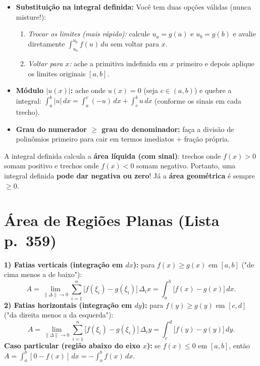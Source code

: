 \documentclass[10pt,a4paper]{article}
\begin{document}
\begin{dica}
    \begin{itemize}
        \item \textbf{Substituição na integral definida:} Você tem duas opções válidas (nunca misture!):
              \begin{enumerate}
                  \item \emph{Trocar os limites (mais rápido):} calcule $u_a = g(a)$ e $u_b = g(b)$ e avalie diretamente $\int_{u_a}^{u_b} f(u)\,du$ sem voltar para $x$.
                  \item \emph{Voltar para $x$:} ache a primitiva indefinida em $x$ primeiro e depois aplique os limites originais $[a,b]$.
              \end{enumerate}
        \item \textbf{Módulo $|u(x)|$:} ache onde $u(x) = 0$ (seja $c \in (a,b)$) e quebre a integral: $\int_{a}^{b} |u|\,dx = \int_{a}^{c} (-u)\,dx + \int_{c}^{b} u\,dx$ (conforme os sinais em cada trecho).
        \item \textbf{Grau do numerador $\ge$ grau do denominador:} faça a divisão de polinômios primeiro para cair em termos imediatos + fração própria.
    \end{itemize}
\end{dica}

\begin{cuidado}
    A integral definida calcula a \textbf{área líquida (com sinal)}: trechos onde $f(x) > 0$ somam positivo e trechos onde $f(x) < 0$ somam negativo. Portanto, uma integral definida \textbf{pode dar negativa ou zero}! Já a \textbf{área geométrica} é sempre $\ge 0$.
\end{cuidado}

\section{Área de Regiões Planas (Lista p.\ 359)}

\begin{teo}
    \textbf{1) Fatias verticais (integração em $dx$):} para $f(x) \ge g(x)$ em $[a,b]$ ("de cima menos a de baixo"):
    \[
        A = \lim_{\|\Delta\| \to 0} \sum_{i=1}^{n} \big[f(\xi_i) - g(\xi_i)\big]\,\Delta_i x = \int_{a}^{b} \big[f(x) - g(x)\big]\,dx.
    \]
    \textbf{2) Fatias horizontais (integração em $dy$):} para $f(y) \ge g(y)$ em $[c,d]$ ("da direita menos a da esquerda"):
    \[
        A = \lim_{\|\Delta\| \to 0} \sum_{i=1}^{n} \big[f(\xi_i) - g(\xi_i)\big]\,\Delta_i y = \int_{c}^{d} \big[f(y) - g(y)\big]\,dy.
    \]
    \textbf{Caso particular (região abaixo do eixo $x$):} se $f(x) \le 0$ em $[a,b]$, então $A = \int_{a}^{b} [0 - f(x)]\,dx = -\int_{a}^{b} f(x)\,dx$.
\end{teo}
\end{document}

